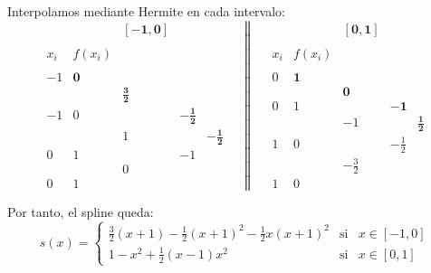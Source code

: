 \begin{ejercicio}
    Interpolamos mediante Hermite en cada intervalo:
    \begin{equation*}
        \begin{array}{c|cccc}
            &&\mathbf{[-1, 0]} \\ \\
            x_i & f(x_i) \\ \\
            -1 & \textbf{0} \\
            && \mathbf{\frac{3}{2}}\\
            -1 & 0 && \mathbf{-\frac{1}{2}}\\
            && 1 && \mathbf{-\frac{1}{2}}\\ 
            0 & 1 && -1\\
            && 0\\
            0 & 1
        \end{array}
        \quad \left\|\quad
        \begin{array}{c|cccc}
            &&\mathbf{[0,1]} \\ \\
            x_i & f(x_i) \\ \\
            0 & \textbf{1} \\
            && \mathbf{0}\\
            0 & 1 && \mathbf{-1}\\
            && -1 && \mathbf{\frac{1}{2}}\\ 
            1 & 0 && -\frac{1}{2}\\
            && -\frac{3}{2}\\
            1 & 0
        \end{array}\right.
    \end{equation*}

    Por tanto, el spline queda:
    \begin{equation*}
        s(x)=\left\{\begin{array}{ccl}
            \frac{3}{2}(x+1)-\frac{1}{2}(x+1)^2-\frac{1}{2}x(x+1)^2 & \text{si} & x\in [-1, 0] \\
            1-x^2+\frac{1}{2}(x-1)x^2 & \text{si} & x\in [0,1]
        \end{array} \right.
    \end{equation*}
\end{ejercicio}

